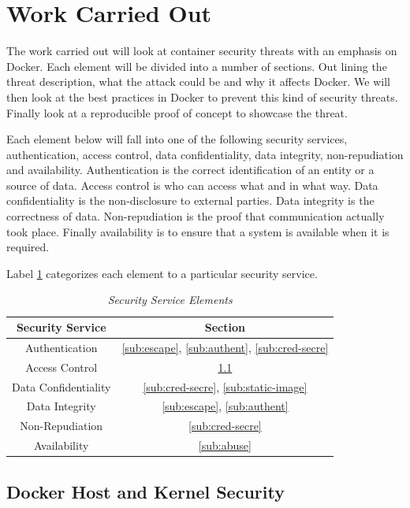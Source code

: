 \section{Work Carried Out}
\label{sub:practical}
The work carried out will look at container security threats with an emphasis on Docker. Each element will be divided into a number of sections. Out lining the threat description, what the attack could be and why it affects Docker. We will then look at the best practices in Docker to prevent this kind of security threats. Finally look at a reproducible proof of concept to showcase the threat.

Each element below will fall into one of the following security services, authentication, access control, data confidentiality, data integrity, non-repudiation and availability. Authentication is the correct identification of an entity or a source of data. Access control is who can access what and in what way. Data confidentiality is the non-disclosure to external parties. Data integrity is the correctness of data. Non-repudiation is the proof that communication actually took place. Finally availability is to ensure that a system is available when it is required. 

Label \ref{tab:prac-sec} categorizes each element to a particular security service. 

\begin{table}[!ht]
\begin{center}
\begin{tabular}{ ||c|c|| } 
 \hline
 \textbf{Security Service} & \textbf{Section} \\ 
 \hline
 \hline
 Authentication & \ref{sub:escape}, \ref{sub:authent}, \ref{sub:cred-secre} \\
 Access Control & \ref{sub:hostd} \\
 Data Confidentiality & \ref{sub:cred-secre}, \ref{sub:static-image} \\
 Data Integrity & \ref{sub:escape}, \ref{sub:authent} \\
 Non-Repudiation & \ref{sub:cred-secre} \\
 Availability & \ref{sub:abuse} \\
 \hline
 \hline
\end{tabular}
\caption{\em Security Service Elements}
\label{tab:prac-sec}
\end{center}
\end{table}

\subsection{Docker Host and Kernel Security}
\label{sub:hostd}
